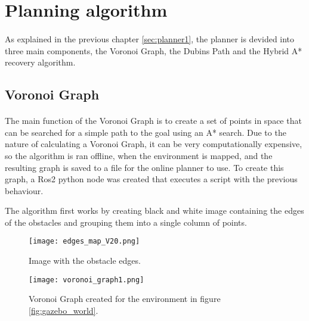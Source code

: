 \section{Planning algorithm}
\label{sec:planning_algorithm}

\paragraph{}As explained in the previous chapter \ref{sec:planner1}, 
the planner is devided into three main components, the Voronoi Graph, the Dubins Path and the Hybrid A* recovery algorithm.

\subsection{Voronoi Graph}
\label{subsec:voronoi_graph}

\paragraph{}The main function of the Voronoi Graph is to create a set of points in space that can be searched for a  
simple path to the goal using an A* search. Due to the nature of calculating a Voronoi Graph, it can be very computationally 
expensive, so the algorithm is ran offline, when the environment is mapped, and the resulting graph is saved to a 
file for the online planner to use. To create this graph, a Ros2 python node was created that executes a script with 
the previous behaviour.

The algorithm first works by creating black and white image containing the edges of the obstacles and grouping them 
into a single column of points.
\begin{figure}[H]
    \centering
    \texttt{[image: edges\_map\_V20.png]}
    \caption{Image with the obstacle edges.}
    \label{fig:voronoi_edges}
\end{figure}

\begin{figure}[H]
    \centering
    \texttt{[image: voronoi\_graph1.png]}
    \caption{Voronoi Graph created for the environment in figure \ref{fig:gazebo_world}.}
    \label{fig:voronoi_graph1}
\end{figure}
